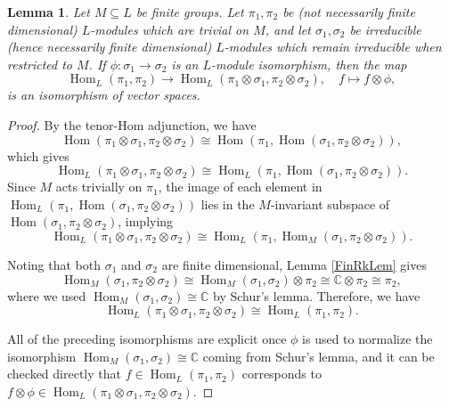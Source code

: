 \documentclass[10pt, letterpaper]{amsart}
\theoremstyle{plain}
\newtheorem{Lem}[equation]{Lemma}
\theoremstyle{definition}
\numberwithin{equation}{section}
\newcommand{\C}{\mathbb{C}}
\newcommand{\Hom}{\operatorname{Hom}}
\begin{document}
\begin{Lem}\label{HOMotimesSig}
    Let $M \subseteq L$ be finite groups. Let $\pi_1, \pi_2$ be (not necessarily finite dimensional) $L$-modules which are trivial on $M$, and let $\sigma_1, \sigma_2$ be irreducible (hence necessarily finite dimensional) $L$-modules which remain irreducible when restricted to $M$. If $\phi:\sigma_1\to\sigma_2$ is an $L$-module isomorphism, then the map
    \[
    \Hom_L(\pi_1,\pi_2)\longrightarrow\Hom_L(\pi_1\otimes\sigma_1, \pi_2\otimes\sigma_2),\quad f\mapsto f\otimes \phi,
    \]
    is an isomorphism of vector spaces.
\end{Lem}
\begin{proof}
    By the tenor-Hom adjunction, we have
    \[
     \Hom(\pi_1\otimes\sigma_1, \pi_2\otimes\sigma_2)\cong \Hom(\pi_1, \Hom(\sigma_1,\pi_2\otimes\sigma_2)),
    \]
    which gives
    \[
     \Hom_L(\pi_1\otimes\sigma_1, \pi_2\otimes\sigma_2)\cong \Hom_L(\pi_1, \Hom(\sigma_1,\pi_2\otimes\sigma_2)).
    \]
    Since $M$ acts trivially on $\pi_1$, the image of each element in $\Hom_L(\pi_1, \Hom(\sigma_1,\pi_2\otimes\sigma_2))$ lies in the $M$-invariant subspace of $\Hom(\sigma_1,\pi_2\otimes\sigma_2)$, implying
    \[
     \Hom_L(\pi_1\otimes\sigma_1, \pi_2\otimes\sigma_2)\cong \Hom_L(\pi_1, \Hom_M(\sigma_1,\pi_2\otimes\sigma_2)).
    \]
    
    Noting that both $\sigma_1$ and $\sigma_2$ are finite dimensional, Lemma \ref{FinRkLem} gives
    \[
    \Hom_M(\sigma_1,\pi_2\otimes\sigma_2)\cong \Hom_M(\sigma_1, \sigma_2)\otimes \pi_2\cong\C\otimes\pi_2\cong\pi_2,
    \]
    where we used $\Hom_M(\sigma_1, \sigma_2)\cong\C$ by Schur's lemma. Therefore, we have
    \[
    \Hom_L(\pi_1\otimes\sigma_1, \pi_2\otimes\sigma_2)\cong \Hom_L(\pi_1, \pi_2).
    \]

    All of the preceding isomorphisms are explicit once $\phi$ is used to normalize the isomorphism $\Hom_M(\sigma_1, \sigma_2)\cong\C$ coming from Schur's lemma, and it can be checked directly that $f\in \Hom_L(\pi_{1},\pi_{2})$ corresponds to $f\otimes \phi\in \Hom_L(\pi_{1}\otimes \sigma_{1},\pi_{2}\otimes \sigma_{2})$.
\end{proof}
\end{document}
